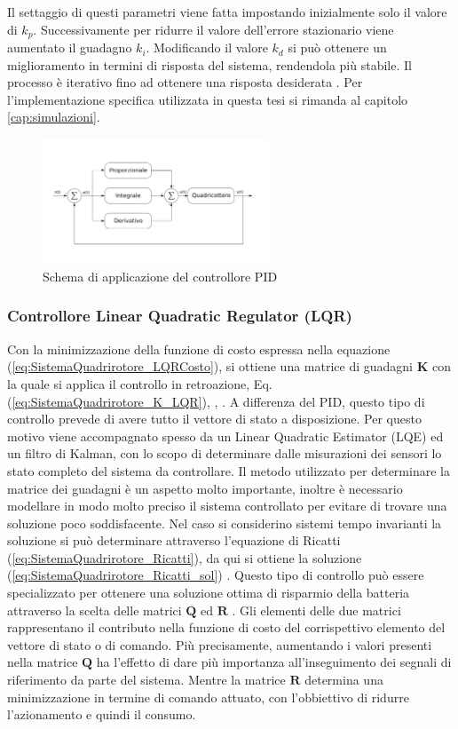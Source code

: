 Il settaggio di questi parametri viene fatta impostando inizialmente solo il valore di $k_p$. Successivamente per ridurre il valore dell'errore stazionario viene aumentato il guadagno $k_i$. Modificando il valore $k_d$ si può ottenere un miglioramento in termini di risposta del sistema, rendendola più stabile. Il processo è iterativo fino ad ottenere una risposta desiderata \cite{advanced-pid-control}.
Per l'implementazione specifica utilizzata in questa tesi si rimanda al capitolo \ref{cap:simulazioni}.


\begin{figure}
	\centering
	\includegraphics[width=0.6\textwidth]{SistemaQuadrirotore/Figure/PID}
	\caption{Schema di applicazione del controllore PID}
\end{figure}

\subsubsection{Controllore Linear Quadratic Regulator (LQR)}
Con la minimizzazione della funzione di costo espressa nella equazione (\ref{eq:SistemaQuadrirotore_LQRCosto}), si ottiene una matrice di guadagni $\mathbf{K}$ con la quale si applica il controllo in retroazione, Eq. (\ref{eq:SistemaQuadrirotore_K_LQR}), \cite{ParaskevopoulosP.N2002MCE}, \cite{6572698}. A differenza del PID, questo tipo di controllo prevede di avere tutto il vettore di stato a disposizione. Per questo motivo viene accompagnato spesso da un Linear Quadratic Estimator (LQE) ed un filtro di Kalman, con lo scopo di determinare dalle misurazioni dei sensori lo stato completo del sistema da controllare. Il metodo utilizzato per determinare la matrice dei guadagni è un aspetto molto importante, inoltre è necessario modellare in modo molto preciso il sistema controllato per evitare di trovare una soluzione poco soddisfacente. Nel caso si considerino sistemi tempo invarianti la soluzione si può determinare attraverso l'equazione di Ricatti (\ref{eq:SistemaQuadrirotore_Ricatti}), da qui si ottiene la soluzione (\ref{eq:SistemaQuadrirotore_Ricatti_sol}) \cite{baseTesi}. Questo tipo di controllo può essere specializzato per ottenere una soluzione ottima di risparmio della batteria attraverso la scelta delle matrici $\mathbf{Q}$ ed $\mathbf{R}$ \cite{KoksalN2018ALQA}. Gli elementi delle due matrici rappresentano il contributo nella funzione di costo del corrispettivo elemento del vettore di stato o di comando. Più precisamente, aumentando i valori presenti nella matrice $\mathbf{Q}$ ha l'effetto di dare più importanza all'inseguimento dei segnali di riferimento da parte del sistema. Mentre la matrice $\mathbf{R}$ determina una minimizzazione in termine di comando attuato, con l'obbiettivo di ridurre l'azionamento e quindi il consumo.

